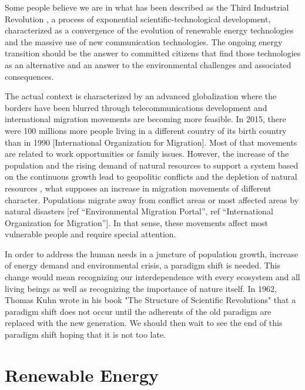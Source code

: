 Some people believe we are in what has been described as the Third Industrial Revolution \cite*{Rifkin2012}, a process of exponential scientific-technological development, characterized as a convergence of the evolution of renewable energy technologies and the massive use of new communication technologies. The ongoing energy transition should be the answer to committed citizens that find those technologies as an alternative and an answer to the environmental challenges and associated consequences.     

The actual context is characterized by an advanced globalization where the borders have been blurred through telecommunications development and international migration movements are becoming more feasible. In 2015, there were 100 millions more people living in a different country of its birth country than in 1990 [International Organization for Migration]. Most of that movements are related to work opportunities or family issues. However, the increase of the population and the rising demand of natural resources to support a system based on the continuous growth lead to geopolitic conflicts and the depletion of natural resources \cite*{Rosa2012,commoner1991}, what supposes an increase in migration movements of different character. Populations migrate away from conflict areas or most affected areas by natural disasters [ref ``Environmental Migration Portal'', ref ``International Organization for Migration'']. In that sense, these movements affect most vulnerable people and require special attention.

In order to address the human needs in a juncture of population growth, increase of energy demand and environmental crisis, a paradigm shift is needed. This change would mean recognizing our interdependence with every ecosystem and all living beings as well as recognizing the importance of nature itself. In 1962, Thomas Kuhn wrote in his book  "The Structure of Scientific Revolutions" that a paradigm shift does not occur until the adherents of the old paradigm are replaced with the new generation. We should then wait to see the end of this paradigm shift hoping that it is not too late.

\section{Renewable Energy}


